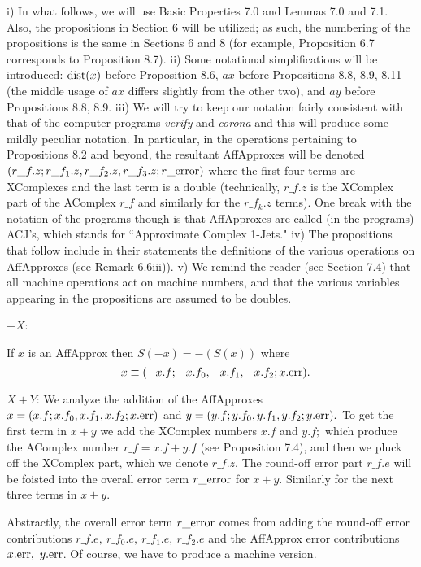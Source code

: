 i)  In what follows, we will use Basic Properties 7.0 and Lemmas 7.0 and 7.1.  Also, the propositions in Section 6
will be utilized;  as such, the numbering of the propositions is the same in Sections 6 and 8 (for example,
Proposition 6.7 corresponds to Proposition 8.7).  
ii)  Some notational simplifications will be introduced: ${\rm dist}(x)$ before Proposition 8.6, $ax$ before Propositions 8.8, 8.9, 8.11
(the middle usage of $ax$ differs slightly from the other two), and $ay$ before Propositions 8.8, 8.9.
iii)  We will try to keep our notation fairly consistent with that of the computer programs {\it verify} and {\it corona} and this will produce some mildly peculiar notation.  In particular, in the operations pertaining to Propositions 8.2 and beyond, the resultant AffApproxes will be denoted $(r\_f.z; r\_f_1.z, r\_f_2.z, 
r\_f_3.z;\break r\_{\rm error})$
where the first four terms are XComplexes and the last term is a double (technically, $r\_f.z$ is the XComplex part of the AComplex  $r\_f$ and similarly for the $r\_f_k.z$ terms).  One break with the notation of the programs though is that AffApproxes are called (in the programs) ACJ's, which stands for ``Approximate Complex 1-Jets."
iv) The propositions that follow include in their statements the definitions of the various operations on AffApproxes (see Remark
6.6iii)).
v)  We remind the reader (see Section 7.4) that all machine operations act on machine numbers, and that the 
various variables appearing in the propositions are assumed to be doubles.
\enddemo

$-X$:

If $x$ is an AffApprox 
then $S(-x) = -(S(x))$ where
$$-x \equiv (-x.f; -x.f_0,-x.f_1,-x.f_2; x.{\rm err}).$$ \endproclaim


$X+Y$:
We analyze the addition of the  {\rm AffApproxes} 
 $x = (x.f; x.f_0,x.f_1,\break x.f_2; x.{\rm err})$  and 
$y = (y.f; y.f_0,y.f_1,y.f_2; y.{\rm err}).$  To get the first term in $x+y$ we add the XComplex numbers $x.f$ and $y.f;$ which
produce the AComplex number $r\_f = x.f + y.f$ (see Proposition 7.4), and then we pluck off the XComplex part,
which we denote $r\_f.z.$  The round-off error part $r\_f.e$ will be foisted into the overall error term $r\_{\rm error}$
for $x+y.$ Similarly for the next three terms in $x + y.$

Abstractly, the overall error term $r\_{\rm error}$ comes from adding the round-off error contributions $r\_f.e,\  r\_f_0.e,\  r\_f_1.e, 
\ r\_f_2.e$ and the AffApprox error contributions $x.{\rm err},\  y.{\rm err}$.  Of course, we have to produce a machine version.

